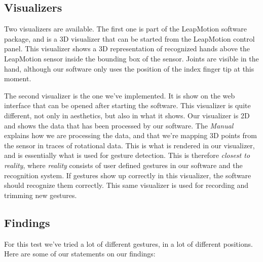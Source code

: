 \documentclass[a4paper]{article}
\begin{document}
  \subsection*{Visualizers}
  Two visualizers are available. The first one is part of the LeapMotion
  software package, and is a 3D visualizer that can be started from the
  LeapMotion control panel. This visualizer shows a 3D representation of
  recognized hands above the LeapMotion sensor inside the bounding box of the
  sensor. Joints are visible in the hand, although our software only uses the
  position of the index finger tip at this moment.

  The second visualizer is the one we've implemented. It is show on the web
  interface that can be opened after starting the software. This visualizer is
  quite different, not only in aesthetics, but also in what it shows. Our
  visualizer is 2D and shows the data that has been processed by our software.
  The \emph{Manual} explains how we are processing the data, and that we're
  mapping 3D points from the sensor in traces of rotational data. This is what
  is rendered in our visualizer, and is essentially what is used for gesture
  detection. This is therefore \emph{closest to reality}, where \emph{reality}
  consists of user defined gestures in our software and the recognition system.
  If gestures show up correctly in this visualizer, the software should
  recognize them correctly. This same visualizer is used for recording and
  trimming new gestures.

  \subsection*{Findings}
  For this test we've tried a lot of different gestures, in a lot of different
  positions. Here are some of our statements on our findings:
\end{document}
